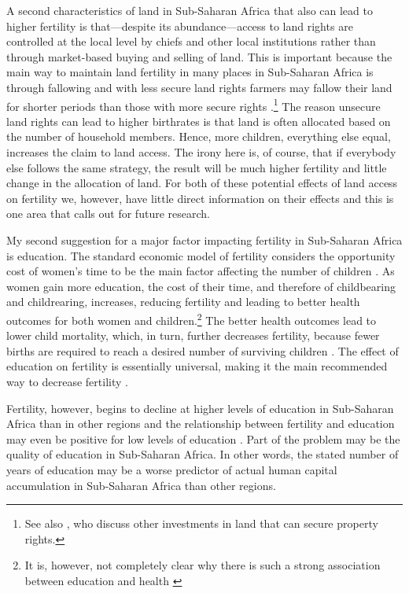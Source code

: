 \documentclass[]{article}
\begin{document}
A second characteristics of land in Sub-Saharan Africa that also can lead to higher fertility is that---despite its abundance---access to land rights are controlled at the local level by chiefs and other local institutions rather than through market-based buying and selling of land. This is important because the main way to maintain land fertility in many places in Sub-Saharan Africa is through fallowing and with less secure land rights farmers may fallow their land for shorter periods than those with more secure rights \citep{Goldstein2008}.\footnote{See also \citet{besley95c}, who discuss other investments in land that can secure property rights.} The reason unsecure land rights can lead to higher birthrates is that land is often allocated based on the number of household members. Hence, more children, everything else equal, increases the claim to land access. The irony here is, of course, that if everybody else follows the same strategy, the result will be much higher fertility and little change in the allocation of land. For both of these potential effects of land access on fertility we, however, have little direct information on their effects and this is one area that calls out for future research.

My second suggestion for a major factor impacting fertility in Sub-Saharan Africa is education. The standard economic model of fertility considers the opportunity cost of women's time to be the main factor affecting the number of children \citep{becker91}. As women gain more education, the cost of their time, and therefore of childbearing and childrearing, increases, reducing fertility and leading to better health outcomes for both women and children.\footnote{It is, however, not completely clear why there is such a strong association between education and health \citep{Thomas1991,Glewwe1999,Kovsted2002}} The better health outcomes lead to lower child mortality, which, in turn, further decreases fertility, because fewer births are required to reach a desired number of surviving children \citep{Ainsworth1996}. The effect of education on fertility is essentially universal, making it the main recommended way to decrease fertility \citep{schultz02}.

Fertility, however, begins to decline at higher levels of education in Sub-Saharan Africa than in other regions and the relationship between fertility and education may even be positive for low levels of education \citep{Ainsworth1996,Benefo1996,Thomas1996}. Part of the problem may be the quality of education in Sub-Saharan Africa. In other words, the stated number of years of education may be a worse predictor of actual human capital accumulation in Sub-Saharan Africa than other regions.
\end{document}
